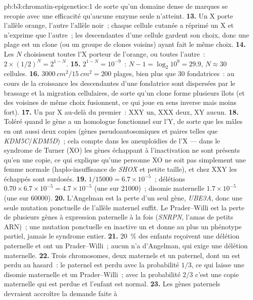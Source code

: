 \begin{solution}{pb:b3:chromatin-epigenetics:1}
de sorte qu'un domaine dense de marques se recopie avec une efficacité
qu'aucune enzyme seule n'atteint.
\textbf{13.} Un X porte l'allèle orange, l'autre l'allèle noir~; chaque
cellule cutanée a réprimé un X et n'exprime que l'autre~; les
descendantes d'une cellule gardent son choix, donc une plage est un
clone (ou un groupe de clones voisins) ayant fait le même choix.
\textbf{14.} Les $N$ choisissent toutes l'X porteur de l'orange, ou
toutes l'autre~: $2\times (1/2)^{N} = 2^{1-N}$.
\textbf{15.} $2^{1-N} = 10^{-9}$~: $N - 1 = \log_{2} 10^{9} = 29.9$,
$N \approx 30$ cellules.
\textbf{16.} $\qty{3000}{cm^2}/\qty{15}{cm^2} = 200$ plages, bien plus
que $30$ fondatrices~: au cours de la croissance les descendantes d'une
fondatrice sont dispersées par le brassage et la migration cellulaires,
de sorte qu'un clone forme plusieurs îlots (et des voisines de même
choix fusionnent, ce qui joue en sens inverse mais moins fort).
\textbf{17.} Un  par X au-delà du premier~: XXY un,
XXX deux, XY aucun.
\textbf{18.} Toléré quand le gène a un homologue fonctionnel sur l'Y,
de sorte que les mâles en ont aussi deux copies (gènes
pseudoautosomiques et paires telles que \emph{KDM5C}/\emph{KDM5D})~;
cela compte dans les aneuploïdies de l'X --- dans le syndrome de Turner
(XO) les gènes échappant à l'inactivation ne sont présents qu'en une
copie, ce qui explique qu'une personne XO ne soit pas simplement une
femme normale (haplo-insuffisance de \emph{SHOX} et petite taille), et
chez XXY les échappés sont surdosés.
\textbf{19.} $1/\num{15000} = 6.7\times 10^{-5}$~; délétions $0.70\times
6.7\times 10^{-5} = 4.7\times 10^{-5}$ (une sur \num{21000})~; disomie
maternelle $1.7\times 10^{-5}$ (une sur \num{60000}).
\textbf{20.} L'Angelman est la perte d'un seul gène, \emph{UBE3A}, donc
une seule mutation ponctuelle de l'allèle maternel suffit. Le
Prader--Willi est la perte de plusieurs gènes à expression paternelle à
la fois (\emph{SNRPN}, l'amas de petits ARN)~; une mutation ponctuelle
en inactive un et donne au plus un phénotype partiel, jamais le
syndrome entier.
\textbf{21.} \qty{20}{\%} des enfants reçoivent une délétion paternelle
et ont un Prader--Willi~; aucun n'a d'Angelman, qui exige une délétion
maternelle.
\textbf{22.} Trois chromosomes, deux maternels et un paternel, dont un
est perdu au hasard~: le paternel est perdu avec la probabilité $1/3$,
ce qui laisse une disomie maternelle et un Prader--Willi~; avec la
probabilité $2/3$ c'est une copie maternelle qui est perdue et l'enfant
est normal.
\textbf{23.} Les gènes paternels devraient accroître la demande faite à

\end{solution}

